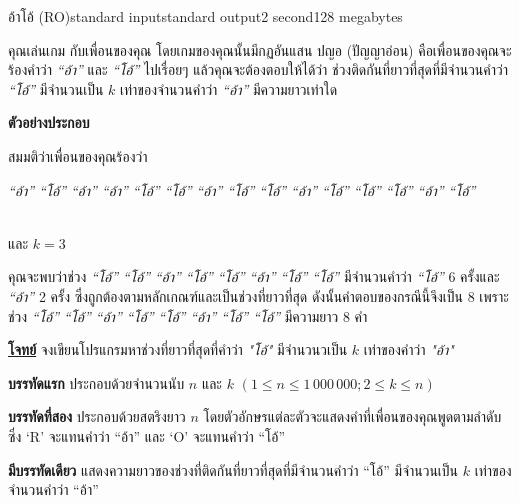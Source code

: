 \documentclass[11pt,a4paper]{article}
\begin{document}
\begin{problem}{อ้าโอ้ (RO)}{standard input}{standard output}{2 second}{128 megabytes}

คุณเล่นเกม กับเพื่อนของคุณ โดยเกมของคุณนั้นมีกฏอันแสน ปญอ (ปัญญาอ่อน) คือเพื่อนของคุณจะร้องคำว่า \textit{“อ้า”} และ \textit{“โอ้”} ไปเรื่อยๆ แล้วคุณจะต้องตอบให้ได้ว่า ช่วงติดกันที่ยาวที่สุดที่มีจำนวนคำว่า \textit{“โอ้”} มีจำนวนเป็น $k$ เท่าของจำนวนคำว่า \textit{“อ้า”} มีความยาวเท่าใด
\bigskip

            \textbf{ตัวอย่างประกอบ}

สมมติว่าเพื่อนของคุณร้องว่า\\
\begin{center}
\textit{“อ้า”} \textit{“โอ้”} \textit{“อ้า”} \textit{“อ้า”} \textit{“โอ้”} \textit{“โอ้”} \textit{“อ้า”} \textit{“โอ้”} \textit{“โอ้”} \textit{“อ้า”} \textit{“โอ้”}  \textit{“โอ้”}  \textit{“โอ้”} \textit{“อ้า”} \textit{“โอ้”} 
\end{center}
\\และ $k = 3$

            คุณจะพบว่าช่วง \textit{“โอ้”} \textit{“โอ้”} \textit{“อ้า”} \textit{“โอ้”} \textit{“โอ้”} \textit{“อ้า”} \textit{“โอ้”}  \textit{“โอ้”} มีจำนวนคำว่า \textit{“โอ้”} $6$ ครั้งและ \textit{“อ้า”} 2 ครั้ง ซึ่งถูกต้องตามหลักเกณฑ์และเป็นช่วงที่ยาวที่สุด ดังนั้นคำตอบของกรณีนี้จึงเป็น $8$ เพราะช่วง \textit{“โอ้”} \textit{“โอ้”} \textit{“อ้า”} \textit{“โอ้”} \textit{“โอ้”} \textit{“อ้า”} \textit{“โอ้”}  \textit{“โอ้”}  มีความยาว $8$ คำ 

\bigskip
\underline{\textbf{โจทย์}}  จงเขียนโปรแกรมหาช่วงที่ยาวที่สุดที่คำว่า \textit{"โอ้"} มีจำนวนวเป็น $k$ เท่าของคำว่า \textit{"อ้า"}


\InputFile

\textbf{บรรทัดแรก} ประกอบด้วยจำนวนนับ $n$ และ $k$ $( 1 \leq n \leq 1\,000\,000; 2 \leq k \leq n )$

\textbf{บรรทัดที่สอง} ประกอบด้วยสตริงยาว $n$ โดยตัวอักษรแต่ละตัวจะแสดงคำที่เพื่อนของคุณพูดตามลำดับ ซึ่ง ‘R’ จะแทนคำว่า “อ้า” และ ‘O’ จะแทนคำว่า “โอ้”



\OutputFile

\textbf{มีบรรทัดเดียว} แสดงความยาวของช่วงที่ติดกันที่ยาวที่สุดที่มีจำนวนคำว่า “โอ้” มีจำนวนเป็น $k$ เท่าของจำนวนคำว่า “อ้า”

\Examples

\begin{example}
%
%
\end{example}


\end{problem}
\end{document}
